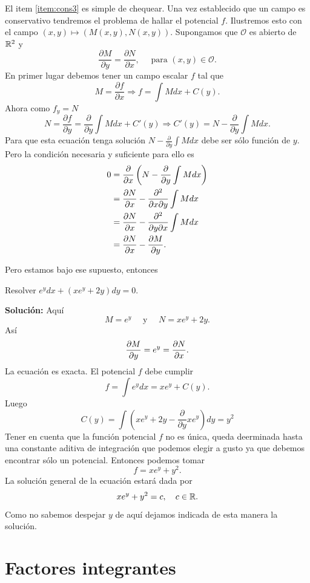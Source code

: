 El item \ref{item:cons3}  es simple de chequear. Una vez establecido que un campo es conservativo tendremos el problema de hallar el potencial $f$.
Ilustremos esto con el campo $(x,y)\mapsto (M(x,y),N(x,y))$. Supongamos que $\mathcal{O}$ es abierto de $\rr^2$ y
\[\frac{\partial M}{\partial y}=\frac{\partial N}{\partial x},\quad\text{ para } (x,y)\in \mathcal{O}.\]
En primer lugar debemos tener un campo escalar $f$ tal que
\[M=\frac{\partial f}{\partial x}\Rightarrow f=\int Mdx +C(y).\]
Ahora como $f_y=N$
\[N=\frac{\partial f}{\partial y}=\frac{\partial}{\partial y}\int Mdx +C'(y)\Rightarrow C'(y)=N-\frac{\partial}{\partial y}\int Mdx .\]
 Para que esta ecuación tenga solución $N-\frac{\partial}{\partial y}\int Mdx$ debe ser sólo función de $y$. Pero la condición necesaria y suficiente para ello es
\[\begin{split}0&=\frac{\partial}{\partial x}\left(N-\frac{\partial}{\partial y}\int Mdx\right)\\
&= \der{N}{x}-\frac{\partial^2}{\partial x\partial y}\int Mdx\\
&=\der{N}{x}-\frac{\partial^2}{\partial y\partial x}\int Mdx\\
&=\der{N}{x}-\der{M}{y}.
   \end{split}
\]

 Pero estamos bajo ese supuesto, entonces

\begin{ejemplo} Resolver $e^ydx+(xe^y+2y)dy=0$.
 \end{ejemplo}


\noindent\textbf{Solución:} Aquí
\[M=e^y\quad\text{ y }\quad N=xe^y+2y.\]
Así
\[\der{M}{y}=e^y=\der{N}{x}.\]
La ecuación es exacta. El potencial $f$ debe cumplir
\[f=\int e^ydx=xe^y+C(y).\]
Luego
\[C(y)=\int\left( xe^y+2y -\frac{\partial}{\partial y} xe^y\right)dy= y^2\]
Tener en cuenta que la función potencial $f$ no es única, queda deerminada hasta una constante aditiva de integración que podemos elegir a gusto ya que
debemos encontrar sólo un potencial. Entonces podemos tomar
\[f= xe^y+y^2.\]
La solución general de la ecuación estará dada por
\[xe^y+y^2=c,\quad c\in\rr.\]
Como no sabemos despejar $\boxed{y}$ de aquí dejamos indicada de esta manera la solución.



\section{Factores integrantes}

